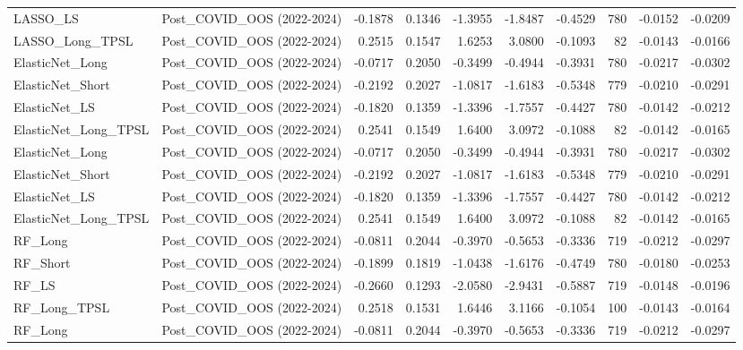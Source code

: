 \begin{tabular}{llrrrrrrrr}
\cline{1-10}
LASSO\_LS & Post\_COVID\_OOS (2022-2024) & -0.1878 & 0.1346 & -1.3955 & -1.8487 & -0.4529 & 780 & -0.0152 & -0.0209 \\
\cline{1-10}
LASSO\_Long\_TPSL & Post\_COVID\_OOS (2022-2024) & 0.2515 & 0.1547 & 1.6253 & 3.0800 & -0.1093 & 82 & -0.0143 & -0.0166 \\
\cline{1-10}
ElasticNet\_Long & Post\_COVID\_OOS (2022-2024) & -0.0717 & 0.2050 & -0.3499 & -0.4944 & -0.3931 & 780 & -0.0217 & -0.0302 \\
\cline{1-10}
ElasticNet\_Short & Post\_COVID\_OOS (2022-2024) & -0.2192 & 0.2027 & -1.0817 & -1.6183 & -0.5348 & 779 & -0.0210 & -0.0291 \\
\cline{1-10}
ElasticNet\_LS & Post\_COVID\_OOS (2022-2024) & -0.1820 & 0.1359 & -1.3396 & -1.7557 & -0.4427 & 780 & -0.0142 & -0.0212 \\
\cline{1-10}
ElasticNet\_Long\_TPSL & Post\_COVID\_OOS (2022-2024) & 0.2541 & 0.1549 & 1.6400 & 3.0972 & -0.1088 & 82 & -0.0142 & -0.0165 \\
\cline{1-10}
ElasticNet\_Long & Post\_COVID\_OOS (2022-2024) & -0.0717 & 0.2050 & -0.3499 & -0.4944 & -0.3931 & 780 & -0.0217 & -0.0302 \\
\cline{1-10}
ElasticNet\_Short & Post\_COVID\_OOS (2022-2024) & -0.2192 & 0.2027 & -1.0817 & -1.6183 & -0.5348 & 779 & -0.0210 & -0.0291 \\
\cline{1-10}
ElasticNet\_LS & Post\_COVID\_OOS (2022-2024) & -0.1820 & 0.1359 & -1.3396 & -1.7557 & -0.4427 & 780 & -0.0142 & -0.0212 \\
\cline{1-10}
ElasticNet\_Long\_TPSL & Post\_COVID\_OOS (2022-2024) & 0.2541 & 0.1549 & 1.6400 & 3.0972 & -0.1088 & 82 & -0.0142 & -0.0165 \\
\cline{1-10}
RF\_Long & Post\_COVID\_OOS (2022-2024) & -0.0811 & 0.2044 & -0.3970 & -0.5653 & -0.3336 & 719 & -0.0212 & -0.0297 \\
\cline{1-10}
RF\_Short & Post\_COVID\_OOS (2022-2024) & -0.1899 & 0.1819 & -1.0438 & -1.6176 & -0.4749 & 780 & -0.0180 & -0.0253 \\
\cline{1-10}
RF\_LS & Post\_COVID\_OOS (2022-2024) & -0.2660 & 0.1293 & -2.0580 & -2.9431 & -0.5887 & 719 & -0.0148 & -0.0196 \\
\cline{1-10}
RF\_Long\_TPSL & Post\_COVID\_OOS (2022-2024) & 0.2518 & 0.1531 & 1.6446 & 3.1166 & -0.1054 & 100 & -0.0143 & -0.0164 \\
\cline{1-10}
RF\_Long & Post\_COVID\_OOS (2022-2024) & -0.0811 & 0.2044 & -0.3970 & -0.5653 & -0.3336 & 719 & -0.0212 & -0.0297 \\

\end{tabular}
